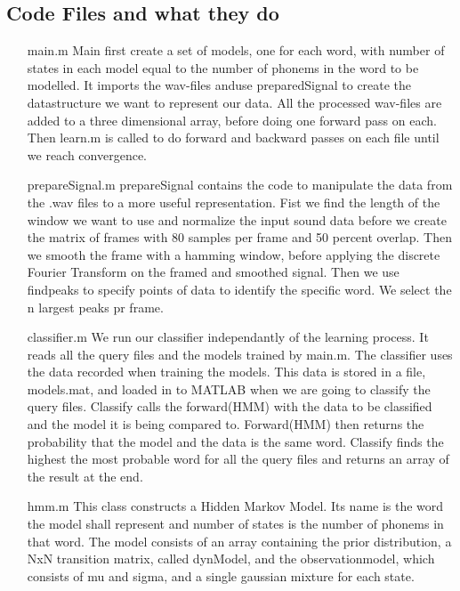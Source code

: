 \documentclass[titlepage]{article}
\begin{document}
\subsection{Code Files and what they do}
\newline
\begin{itemize}
    \item[main.m] Main first create a set of models, one for each word, with number of states in each model equal to the number of phonems in the word to be modelled.  It imports the wav-files anduse preparedSignal to create the datastructure we want to represent our data. All the processed wav-files are added to a three dimensional array, before doing one forward pass on each. Then learn.m is called to do forward and backward passes on each file until we reach convergence.
    
\item[prepareSignal.m] prepareSignal contains the code to manipulate the data from the .wav files to a more useful representation. Fist we find the length of the window we want to use and normalize the input sound data before we create the matrix of frames with 80 samples per frame and 50 percent overlap. Then we smooth the frame with a hamming window, before applying the discrete Fourier Transform on the framed and smoothed signal. Then we use findpeaks to specify points of data to identify the specific word. We select the n largest peaks pr frame.  

\item[classifier.m] We run our classifier independantly of the learning process. It reads all the query files and the models trained by main.m. The classifier uses the data recorded when training the models. This data is stored in a file, models.mat, and loaded in to MATLAB when we are going to classify the query files. Classify calls the forward(HMM) with the data to be classified and the model it is being compared to. Forward(HMM) then returns the probability that the model and the data is the same word. Classify finds the highest the most probable word for all the query files and returns an array of the result at the end. 


\item[hmm.m] This class constructs a Hidden Markov Model. Its name is the word the model shall represent and number of states is the number of phonems in that word. The model consists of an array containing the prior distribution, a NxN transition matrix, called dynModel, and the observationmodel, which consists of mu and sigma, and a single gaussian mixture for each state. 



\end{itemize}
\end{document}
